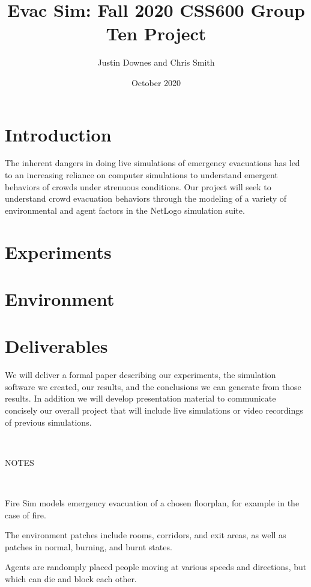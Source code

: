 \documentclass[12pt,letterpaper]{article}
\begin{document}
\title{\vspace{-3cm}Evac Sim: Fall 2020 CSS600 Group Ten Project}
\author{Justin Downes and Chris Smith}
\date{October 2020}
\maketitle

\section {Introduction}

The inherent dangers in doing live simulations of emergency evacuations has led to an increasing reliance on computer simulations to understand emergent behaviors of crowds under strenuous conditions\cite{almeidaCrowdSimulationModeling2013}.  Our project will seek to understand crowd evacuation behaviors through the modeling of a variety of environmental and agent factors in the NetLogo simulation suite.

\section {Experiments}

\section {Environment}

\section {Deliverables}
We will deliver a formal paper describing our experiments, the simulation software we created, our results, and the conclusions we can generate from those results. In addition we will develop presentation material to communicate concisely our overall project that will include live simulations or video recordings of previous simulations.

\

NOTES

\


Fire Sim models emergency evacuation of a chosen floorplan, for example in the case of fire.

The environment patches include rooms, corridors, and exit areas, as well as patches in normal, burning, and burnt states.

Agents are randomply placed people moving at various speeds and directions, but which can die and block each other.
\end{document}
